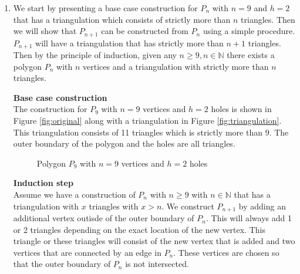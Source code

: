\documentclass{article}
\begin{document}
  \begin{enumerate}
    \item  We start by presenting a base case construction for $P_n$ with $n = 9$ and $h = 2$ that has a triangulation which consists of strictly more than $n$ triangles.
    Then we will show that $P_{n+1}$ can be constructed from $P_n$ using a simple procedure. $P_{n+1}$ will have a triangulation that has strictly more than $n+1$ triangles.
    Then by the principle of induction, given any $n \geq 9, n\in\mathbb{N}$ there exists a polygon $P_n$ with $n$ vertices and a triangulation with strictly more than $n$ triangles.

    \textbf{Base case construction} \\
    The construction for $P_9$ with $n=9$ vertices and $h=2$ holes is shown in Figure \ref{fig:original} along with a triangulation in Figure \ref{fig:triangulation}. 
    This triangulation consists of 11 triangles which is strictly more than 9.
    The outer boundary of the polygon and the holes are all triangles.
    
    \begin{figure}[H]
      \centering
        \caption{Polygon $P_9$ with $n=9$ vertices and $h=2$ holes} 
        \label{fig:p9}
      \end{figure}
  

    \textbf{Induction step} \\
    Assume we have a construction of $P_n$ with $n \geq 9$ with $n\in\mathbb{N}$ that has a triangulation with $x$ triangles with $x > n$.
    We construct $P_{n+1}$ by adding an additional vertex outisde of the outer boundary of $P_n$. 
    This will always add 1 or 2 triangles depending on the exact location of the new vertex. 
    This triangle or these triangles will consist of the new vertex that is added and two vertices that are connected by an edge in $P_n$. 
    These vertices are chosen so that the outer boundary of $P_n$ is not intersected. 


\end{enumerate}
\end{document}
